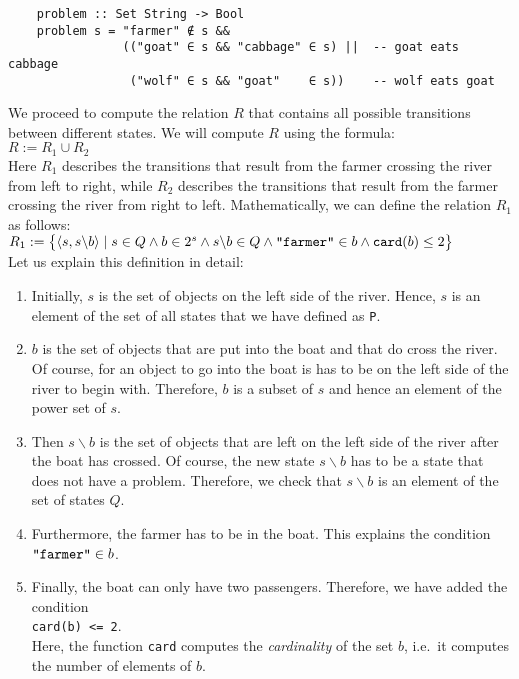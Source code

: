 \begin{verbatim}
    problem :: Set String -> Bool
    problem s = "farmer" ∉ s &&
                (("goat" ∈ s && "cabbage" ∈ s) ||  -- goat eats cabbage
                 ("wolf" ∈ s && "goat"    ∈ s))    -- wolf eats goat
\end{verbatim}
We proceed to compute the relation $R$ that contains all possible transitions between
different states.  We will compute $R$ using the formula:
\\[0.2cm]
\hspace*{1.3cm}
$R := R_1 \cup R_2$
\\[0.2cm]
Here $R_1$ describes the transitions that result from the farmer crossing the river from left
to right, while $R_2$ describes the transitions that result from the farmer crossing the river
from right to left.  Mathematically, we can define the relation $R_1$ as follows:
\\[0.2cm]
\hspace*{1.3cm}
$R_1 := \bigl\{ \langle s, s \backslash b \rangle \mid s \in Q \wedge b \in 2^s \wedge s \backslash b \in Q \wedge
                \squote{farmer} \in b \wedge \mathtt{card}(b) \leq 2 \bigr\}$
\\[0.2cm]
Let us explain this definition in detail:
\begin{enumerate}
\item Initially, $s$ is the set of objects on the left side of the river.  Hence, $s$
      is an element of the set of all states that we have defined as \texttt{P}.
\item $b$ is the set of objects that are put into the boat and that do cross the river.  Of
      course, for an object to go into the boat is has to be on the left side of the river to begin
      with.  Therefore, $b$ is a subset of $s$ and hence an element of the power set
      of $s$. 
\item Then  $s \backslash b$ is the set of objects that are left on the left side of the river after
      the boat has crossed.  Of course, the new state $s \backslash b$ has to be a state that does not
      have a problem.  Therefore, we check that $s \backslash b$ is an element of the set of states $Q$.
\item Furthermore, the farmer has to be in the boat.  This explains the condition 
      \\[0.2cm]
      \hspace*{1.3cm}
      $\squote{farmer} \in b$.
\item Finally, the boat can only have two passengers.  Therefore, we have added the condition
      \\[0.2cm]
      \hspace*{1.3cm}
      \texttt{\texttt{card}(b) <= 2}.
      \\[0.2cm]
      Here, the function \texttt{card} computes the \emph{cardinality} of the set $b$, i.e.~it computes the
      number of elements of $b$.
\end{enumerate}

